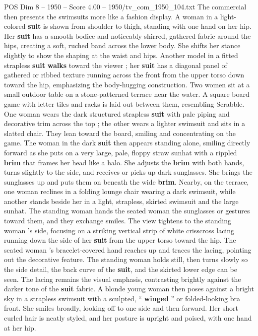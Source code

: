\begin{textsample}{POS Dim 8 – 1950 – Score 4.00 – 1950/tv\_com\_1950\_104.txt}
The commercial then presents the swimsuits more like a fashion display.
A woman in a light-colored \textbf{suit} is shown from shoulder to thigh, standing with one hand on her hip.
Her \textbf{suit} has a smooth bodice and noticeably shirred, gathered fabric around the hips, creating a soft, ruched band across the lower body.
She shifts her stance slightly to show the shaping at the waist and hips.
Another model in a fitted strapless \textbf{suit} \textbf{walks} toward the viewer ; her \textbf{suit} has a diagonal panel of gathered or ribbed texture running across the front from the upper torso down toward the hip, emphasizing the body-hugging construction.
Two women sit at a small outdoor table on a stone-patterned terrace near the water.
A square board game with letter tiles and racks is laid out between them, resembling Scrabble.
One woman wears the dark structured strapless \textbf{suit} with pale piping and decorative trim across the top ; the other wears a lighter swimsuit and sits in a slatted chair.
They lean toward the board, smiling and concentrating on the game.
The woman in the dark \textbf{suit} then appears standing alone, smiling directly forward as she puts on a very large, pale, floppy straw sunhat with a rippled \textbf{brim} that frames her head like a halo.
She adjusts the \textbf{brim} with both hands, turns slightly to the side, and receives or picks up dark sunglasses.
She brings the sunglasses up and puts them on beneath the wide \textbf{brim}.
Nearby, on the terrace, one woman reclines in a folding lounge chair wearing a dark swimsuit, while another stands beside her in a light, strapless, skirted swimsuit and the large sunhat.
The standing woman hands the seated woman the sunglasses or gestures toward them, and they exchange smiles.
The view tightens to the standing woman ’s side, focusing on a striking vertical strip of white crisscross lacing running down the side of her \textbf{suit} from the upper torso toward the hip.
The seated woman ’s bracelet-covered hand reaches up and traces the lacing, pointing out the decorative feature.
The standing woman holds still, then turns slowly so the side detail, the back curve of the \textbf{suit}, and the skirted lower edge can be seen.
The lacing remains the visual emphasis, contrasting brightly against the darker tone of the \textbf{suit} fabric.
A blonde young woman then poses against a bright sky in a strapless swimsuit with a sculpted, “ \textbf{winged} ” or folded-looking bra front.
She smiles broadly, looking off to one side and then forward.
Her short curled hair is neatly styled, and her posture is upright and poised, with one hand at her hip.

\end{textsample}
